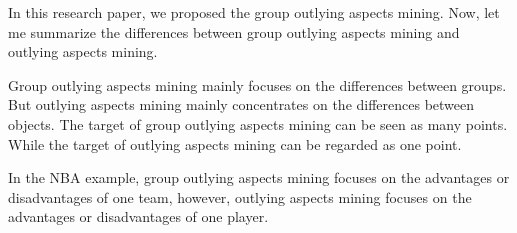 \documentclass[
 size=14pt,
 paper=smartboard,  %
 mode=present, 		%
 display=slides, 	%
 style=tuliplab,  	%
 pauseslide,
 fleqn,leqno]{powerdot}
\begin{document}
\begin{slide}[toc=,bm=]{}
    \begin{note}
    In this research paper,
    we proposed the group outlying aspects mining.
    Now,
    let me summarize the differences between group outlying aspects mining and outlying aspects mining.
    
    Group outlying aspects mining mainly focuses on the differences between groups.
    But outlying aspects mining mainly concentrates on the differences between objects.
    The target of group outlying aspects mining can be seen as many points.
    While the target of outlying aspects mining can be regarded as one point.
    
    In the NBA example,
    group outlying aspects mining focuses on the advantages
    or disadvantages of one team,
    however,
    outlying aspects mining focuses on the advantages or disadvantages of one player.
    \end{note}
    
    \end{slide}
\end{document}
